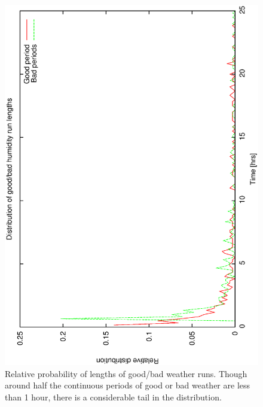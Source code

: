 \begin{figure}[htbp] 
\begin{center}
    \includegraphics[scale=0.4, angle=-90]{figures/ecs/good_bad_hum_bin.eps}
\end{center}
\caption[Relative probability of lengths of good/bad weather runs.]
{Relative probability of lengths of good/bad weather runs. Though around half the continuous periods of good or bad weather are less than 1 hour, there is a considerable tail in the distribution.}
\label{fig:good_bad_hum_dist}
\end{figure}

